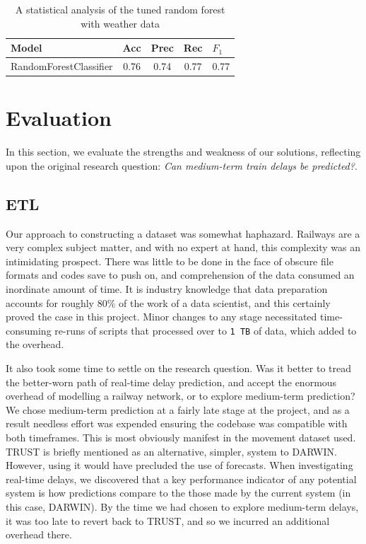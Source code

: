 \documentclass[12pt,a4paper]{article}
\begin{document}
\begin{table}[htb]
\centering
\caption{A statistical analysis of the tuned random forest with weather data}
\label{table:results_weather}
\begin{tabular}{|p{5cm}|c|c|c|c|}
\hline
\textbf{Model}                  & \multicolumn{1}{l|}{\textbf{Acc}} & \multicolumn{1}{l|}{\textbf{Prec}} & \multicolumn{1}{l|}{\textbf{Rec}} & \multicolumn{1}{l|}{\textbf{$F_1$}} \\ \hline
RandomForestClassifier & 0.76                     & 0.74                     & 0.77                     & 0.77                      \\ \hline
\end{tabular}
\end{table}

\section{Evaluation}

In this section, we evaluate the strengths and weakness of our solutions, reflecting upon the original research question: \textit{Can medium-term train delays be predicted?}.

\subsection{ETL}

Our approach to constructing a dataset was somewhat haphazard. Railways are a very complex subject matter, and with no expert at hand, this complexity was an intimidating prospect. There was little to be done in the face of obscure file formats and codes save to push on, and comprehension of the data consumed an inordinate amount of time.  It is industry knowledge that data preparation accounts for roughly $80\%$ of the work of a data scientist, and this certainly proved the case in this project. Minor changes to any stage necessitated time-consuming re-runs of scripts that processed over to \verb|1 TB| of data, which added to the overhead. 

It also took some time to settle on the research question. Was it better to tread the better-worn path of real-time delay prediction, and accept the enormous overhead of modelling a railway network, or to explore medium-term prediction? We chose medium-term prediction at a fairly late stage at the project, and as a result needless effort was expended ensuring the codebase was compatible with both timeframes. This is most obviously manifest in the movement dataset used. TRUST is briefly mentioned as an alternative, simpler, system to DARWIN. However, using it would have precluded the use of forecasts. When investigating real-time delays, we discovered that a key performance indicator of any potential system is how predictions compare to the those made by the current system (in this case, DARWIN). By the time we had chosen to explore medium-term delays, it was too late to revert back to TRUST, and so we incurred an additional overhead there. 
\end{document}
